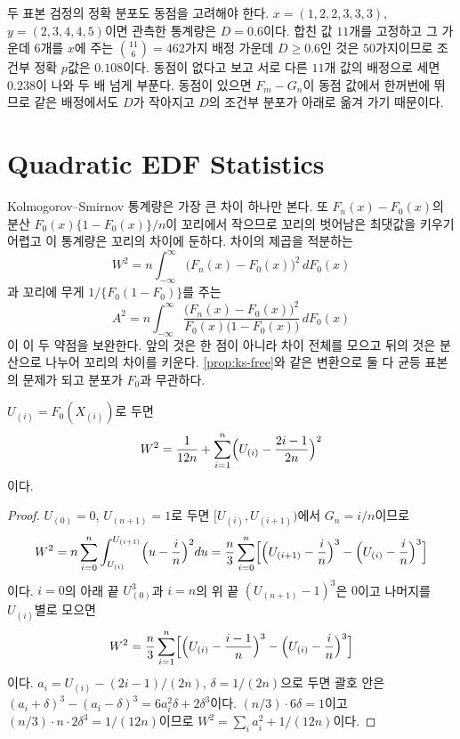 두 표본 검정의 정확 분포도 동점을 고려해야 한다. $x=(1,2,2,3,3,3)$, $y=(2,3,4,4,5)$이면 관측한 통계량은 $D=0.6$이다. 합친 값 $11$개를 고정하고 그 가운데 $6$개를 $x$에 주는 $\binom{11}6=462$가지 배정 가운데 $D\ge0.6$인 것은 $50$가지이므로 조건부 정확 $p$값은 $0.108$이다. 동점이 없다고 보고 서로 다른 $11$개 값의 배정으로 세면 $0.238$이 나와 두 배 넘게 부푼다. 동점이 있으면 $F_m-G_n$이 동점 값에서 한꺼번에 뛰므로 같은 배정에서도 $D$가 작아지고 $D$의 조건부 분포가 아래로 옮겨 가기 때문이다.

\section{Quadratic EDF Statistics}
\label{sec:cvm-ad}

Kolmogorov--Smirnov 통계량은 가장 큰 차이 하나만 본다. 또 $F_n(x)-F_0(x)$의 분산 $F_0(x)\{1-F_0(x)\}/n$이 꼬리에서 작으므로 꼬리의 벗어남은 최댓값을 키우기 어렵고 이 통계량은 꼬리의 차이에 둔하다. 차이의 제곱을 적분하는 
\[
W^2=n\int_{-\infty}^\infty\bigl(F_n(x)-F_0(x)\bigr)^2\,dF_0(x)
\]
과 꼬리에 무게 $1/\{F_0(1-F_0)\}$를 주는 \cite{anderson1952}
\[
A^2=n\int_{-\infty}^\infty\frac{\bigl(F_n(x)-F_0(x)\bigr)^2}{F_0(x)\bigl(1-F_0(x)\bigr)}\,dF_0(x)
\]
이 이 두 약점을 보완한다. 앞의 것은 한 점이 아니라 차이 전체를 모으고 뒤의 것은 분산으로 나누어 꼬리의 차이를 키운다. \cref{prop:ks-free}와 같은 변환으로 둘 다 균등 표본의 문제가 되고 분포가 $F_0$과 무관하다.

\begin{proposition}
\label{prop:cvm-formula}
$U_{(i)}=F_0(X_{(i)})$로 두면
\[
W^2=\frac1{12n}+\sum_{i=1}^n\Bigl(U_{(i)}-\frac{2i-1}{2n}\Bigr)^2
\]
이다.
\end{proposition}

\begin{proof}
$U_{(0)}=0$, $U_{(n+1)}=1$로 두면 $[U_{(i)},U_{(i+1)})$에서 $G_n=i/n$이므로
\[
W^2=n\sum_{i=0}^n\int_{U_{(i)}}^{U_{(i+1)}}\Bigl(u-\frac in\Bigr)^2du=\frac n3\sum_{i=0}^n\Bigl[\Bigl(U_{(i+1)}-\frac in\Bigr)^3-\Bigl(U_{(i)}-\frac in\Bigr)^3\Bigr]
\]
이다. $i=0$의 아래 끝 $U_{(0)}^3$과 $i=n$의 위 끝 $(U_{(n+1)}-1)^3$은 $0$이고 나머지를 $U_{(i)}$별로 모으면
\[
W^2=\frac n3\sum_{i=1}^n\Bigl[\Bigl(U_{(i)}-\frac{i-1}n\Bigr)^3-\Bigl(U_{(i)}-\frac in\Bigr)^3\Bigr]
\]
이다. $a_i=U_{(i)}-(2i-1)/(2n)$, $\delta=1/(2n)$으로 두면 괄호 안은 $(a_i+\delta)^3-(a_i-\delta)^3=6a_i^2\delta+2\delta^3$이다. $(n/3)\cdot6\delta=1$이고 $(n/3)\cdot n\cdot2\delta^3=1/(12n)$이므로 $W^2=\sum_ia_i^2+1/(12n)$이다.
\end{proof}

